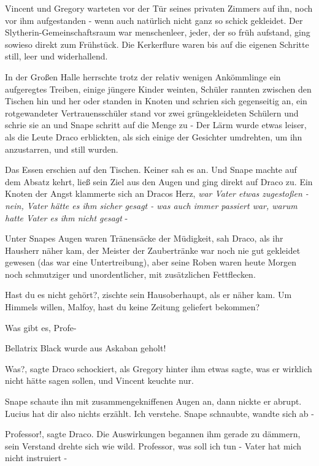 Vincent und Gregory warteten vor der Tür seines privaten Zimmers auf ihn, noch
vor ihm aufgestanden - wenn auch natürlich nicht ganz so schick gekleidet. Der
Slytherin-Gemeinschaftsraum war menschenleer, jeder, der so früh aufstand, ging
sowieso direkt zum Frühstück. Die Kerkerflure waren bis auf die eigenen Schritte
still, leer und widerhallend.

In der Großen Halle herrschte trotz der relativ wenigen Ankömmlinge ein
aufgeregtes Treiben, einige jüngere Kinder weinten, Schüler rannten zwischen den
Tischen hin und her oder standen in Knoten und schrien sich gegenseitig an, ein
rotgewandeter Vertrauensschüler stand vor zwei grüngekleideten Schülern und
schrie sie an und Snape schritt auf die Menge zu - Der Lärm wurde etwas leiser,
als die Leute Draco erblickten, als sich einige der Gesichter umdrehten, um ihn
anzustarren, und still wurden.

Das Essen erschien auf den Tischen. Keiner sah es an. Und Snape machte auf dem
Absatz kehrt, ließ sein Ziel aus den Augen und ging direkt auf Draco zu. Ein
Knoten der Angst klammerte sich an Dracos Herz, \emph{war Vater etwas zugestoßen
- nein, Vater hätte es ihm sicher gesagt - was auch immer passiert war, warum
hatte Vater es ihm nicht gesagt} -

Unter Snapes Augen waren Tränensäcke der Müdigkeit, sah Draco, als ihr Hausherr
näher kam, der Meister der Zaubertränke war noch nie gut gekleidet gewesen (das
war eine Untertreibung), aber seine Roben waren heute Morgen noch schmutziger
und unordentlicher, mit zusätzlichen Fettflecken.

\glqq{}Hast du es nicht gehört?\grqq{}, zischte sein Hausoberhaupt, als er näher
kam. \glqq{}Um Himmels willen, Malfoy, hast du keine Zeitung geliefert
bekommen?\grqq{}

\glqq{}Was gibt es, Profe-\grqq{}

\glqq{}Bellatrix Black wurde aus Askaban geholt!\grqq{}

\glqq{}Was?\grqq{}, sagte Draco schockiert, als Gregory hinter ihm etwas sagte,
was er wirklich nicht hätte sagen sollen, und Vincent keuchte nur.

Snape schaute ihn mit zusammengekniffenen Augen an, dann nickte er abrupt. \glqq
Lucius hat dir also nichts erzählt. Ich verstehe.\grqq{} Snape schnaubte, wandte
sich ab -

\glqq{}Professor!\grqq{}, sagte Draco. Die Auswirkungen begannen ihm gerade zu
dämmern, sein Verstand drehte sich wie wild. \glqq{}Professor, was soll ich tun -
Vater hat mich nicht instruiert -\grqq{}

